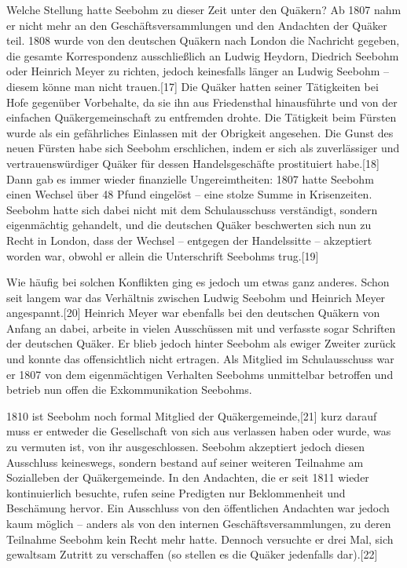 Welche Stellung hatte Seebohm zu dieser Zeit unter den Quäkern? Ab 1807 nahm er
nicht mehr an den Geschäftsversammlungen und den Andachten der Quäker teil. 1808
wurde von den deutschen Quäkern nach London die Nachricht gegeben, die gesamte
Korrespondenz ausschließlich an Ludwig Heydorn, Diedrich Seebohm oder Heinrich
Meyer zu richten, jedoch keinesfalls länger an Ludwig Seebohm – diesem könne man
nicht trauen.[17] Die Quäker hatten seiner Tätigkeiten bei Hofe gegenüber
Vorbehalte, da sie ihn aus Friedensthal hinausführte und von der einfachen
Quäkergemeinschaft zu entfremden drohte. Die Tätigkeit beim Fürsten wurde als
ein gefährliches Einlassen mit der Obrigkeit angesehen. Die Gunst des neuen
Fürsten habe sich Seebohm erschlichen, indem er sich als zuverlässiger und
vertrauenswürdiger Quäker für dessen Handelsgeschäfte prostituiert habe.[18]
Dann gab es immer wieder finanzielle Ungereimtheiten: 1807 hatte Seebohm einen
Wechsel über 48 Pfund eingelöst – eine stolze Summe in Krisenzeiten. Seebohm
hatte sich dabei nicht mit dem Schulausschuss verständigt, sondern eigenmächtig
gehandelt, und die deutschen Quäker beschwerten sich nun zu Recht in London,
dass der Wechsel – entgegen der Handelssitte – akzeptiert worden war, obwohl er
allein die Unterschrift Seebohms trug.[19]

\medskip

Wie häufig bei solchen Konflikten ging es jedoch um etwas ganz anderes. Schon
seit langem war das Verhältnis zwischen Ludwig Seebohm und Heinrich Meyer
angespannt.[20] Heinrich Meyer war ebenfalls bei den deutschen Quäkern von
Anfang an dabei, arbeite in vielen Ausschüssen mit und verfasste sogar Schriften
der deutschen Quäker. Er blieb jedoch hinter Seebohm als ewiger Zweiter zurück
und konnte das offensichtlich nicht ertragen. Als Mitglied im Schulausschuss war
er 1807 von dem eigenmächtigen Verhalten Seebohms unmittelbar betroffen und
betrieb nun offen die Exkommunikation Seebohms.

\medskip

1810 ist Seebohm noch formal Mitglied der Quäkergemeinde,[21] kurz darauf muss
er entweder die Gesellschaft von sich aus verlassen haben oder wurde, was zu
vermuten ist, von ihr ausgeschlossen. Seebohm akzeptiert jedoch diesen
Ausschluss keineswegs, sondern bestand auf seiner weiteren Teilnahme am
Sozialleben der Quäkergemeinde. In den Andachten, die er seit 1811 wieder
kontinuierlich besuchte, rufen seine Predigten nur Beklommenheit und Beschämung
hervor. Ein Ausschluss von den öffentlichen Andachten war jedoch kaum möglich –
anders als von den internen Geschäftsversammlungen, zu deren Teilnahme Seebohm
kein Recht mehr hatte. Dennoch versuchte er drei Mal, sich gewaltsam Zutritt zu
verschaffen (so stellen es die Quäker jedenfalls dar).[22]

